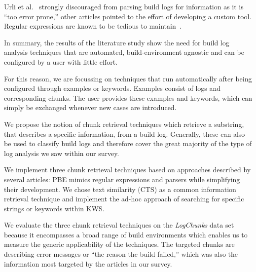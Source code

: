 Urli et al.~\cite{urli2018design} strongly discouraged from parsing
build logs for information as it is ``too error prone,'' other
articles pointed to the effort of developing a custom tool.
Regular expressions are known to be tedious to
maintain~\cite{michael2019regexes}.


In summary, the results of the literature study show the need for
build log
analysis techniques that are automated, build-environment agnostic
and can be configured by a user with little effort.


For this reason, we are focussing on techniques that run automatically
after being configured through examples or keywords.
Examples consist of logs and corresponding chunks.
The user provides these examples and keywords, which can simply be
exchanged whenever new cases are introduced.

We propose the notion of chunk retrieval techniques which retrieve
a substring, that describes a specific information, from a build log.
Generally, these can also be used to classify build logs and therefore
cover the great majority of the type of log analysis we saw within
our survey.

We implement three chunk retrieval techniques based on approaches
described by several articles:
PBE mimics regular expressions and parsers while simplifying
their development.
We chose text similarity (CTS) as a common information retrieval
technique and implement the ad-hoc approach of
searching for specific strings or keywords within KWS\@.

We evaluate the three chunk retrieval techniques on the
\emph{LogChunks} data set because it encompasses a broad range of
build environments which enables us to measure the generic
applicability of the techniques.
The targeted chunks are describing error messages or
``the reason the build failed,'' which was also the information
most targeted by the articles in our survey.

